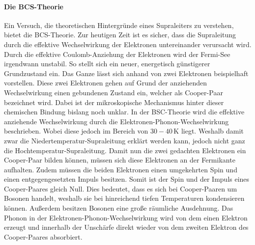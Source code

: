 \paragraph{Die BCS-Theorie}
Ein Versuch, die theoretischen Hintergr\"unde eines Supraleiters zu verstehen, bietet die BCS-Theorie.
Zur heutigen Zeit ist es sicher, dass die Supraleitung durch die effektive Wechselwirkung der Elektronen untereinander verursacht wird.
Durch die effektive Coulomb-Anziehung der Elektronen wird der Fermi-See irgendwann unstabil.
So stellt sich ein neuer, energetisch g\"unstigerer Grundzustand ein.
Das Ganze l\"asst sich anhand von zwei Elektronen beispielhaft vorstellen.
Diese zwei Elektronen gehen auf Grund der anziehenden Wechselwirkung einen gebundenen Zustand ein, welcher als Cooper-Paar bezeichnet wird.
Dabei ist der mikroskopische Mechanismus hinter dieser chemischen Bindung bislang noch unklar.
In der BSC-Theorie wird die effektive anziehende Wechselwirkung durch die Elektronen-Phonon-Wechselwirkung beschrieben.
Wobei diese jedoch im Bereich von $30-40 \, $K liegt.
Weshalb damit zwar die Niedertemperatur-Supraleitung erkl\"art werden kann, jedoch nicht ganz die Hochtemperatur-Supraleitung.
Damit nun die zwei gedachten Elektronen ein Cooper-Paar bilden k\"onnen, m\"ussen sich diese Elektronen an der Fermikante aufhalten.
Zudem m\"ussen die beiden Elektronen einen umgekehrten Spin und einen entgegengesetzten Impuls besitzen.
Somit ist der Spin und der Impuls eines Cooper-Paares gleich Null.
Dies bedeutet, dass es sich bei Cooper-Paaren um Bosonen handelt, weshalb sie bei hinreichend tiefen Temperaturen kondensieren k\"onnen.
Au{\ss}erdem besitzen Bosonen eine gro{\ss}e r\"aumliche Ausdehnung.
Das Phonon in der Elektronen-Phonon-Wechselwirkung wird von dem einen Elektron erzeugt und innerhalb der Unsch\"arfe direkt wieder von dem zweiten Elektron des Cooper-Paares absorbiert.